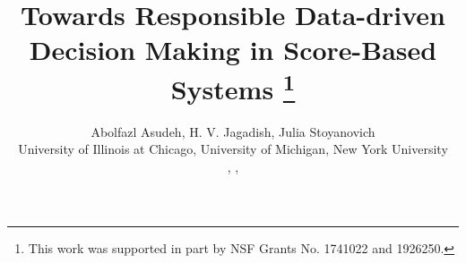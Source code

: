 \documentclass[11pt]{article}
\begin{document}
\title{Towards Responsible Data-driven Decision Making in Score-Based Systems
\footnote{This work was supported in part by NSF Grants No. 1741022 and 1926250.}
}
\author{Abolfazl Asudeh\footnotemark[2], H. V. Jagadish\footnotemark[3], Julia Stoyanovich\footnotemark[4] \\
\footnotemark[2]  University of Illinois at Chicago, \footnotemark[3] University of Michigan, \footnotemark[4] New York University\\
, , 
}

\maketitle
\end{document}
